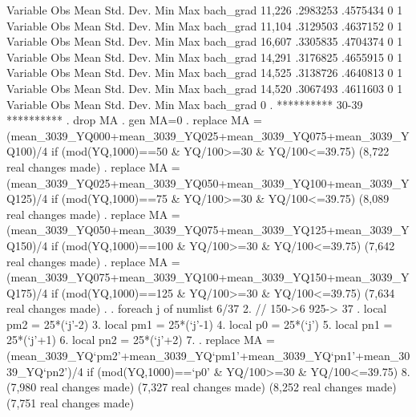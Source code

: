 {\smallskip}
    Variable {\VBAR}        Obs        Mean    Std. Dev.       Min        Max
   bach_grad {\VBAR}     11,226    .2983253    .4575434          0          1
{\smallskip}
    Variable {\VBAR}        Obs        Mean    Std. Dev.       Min        Max
   bach_grad {\VBAR}     11,104    .3129503    .4637152          0          1
{\smallskip}
    Variable {\VBAR}        Obs        Mean    Std. Dev.       Min        Max
   bach_grad {\VBAR}     16,607    .3305835    .4704374          0          1
{\smallskip}
    Variable {\VBAR}        Obs        Mean    Std. Dev.       Min        Max
   bach_grad {\VBAR}     14,291    .3176825    .4655915          0          1
{\smallskip}
    Variable {\VBAR}        Obs        Mean    Std. Dev.       Min        Max
   bach_grad {\VBAR}     14,525    .3138726    .4640813          0          1
{\smallskip}
    Variable {\VBAR}        Obs        Mean    Std. Dev.       Min        Max
   bach_grad {\VBAR}     14,520    .3067493    .4611603          0          1
{\smallskip}
    Variable {\VBAR}        Obs        Mean    Std. Dev.       Min        Max
   bach_grad {\VBAR}          0
{\smallskip}
. **********  30-39 **********
. drop MA
{\smallskip}
. gen MA=0
{\smallskip}
. replace MA = (mean_3039_YQ000+mean_3039_YQ025+mean_3039_YQ075+mean_3039_YQ100)/4 if (mod(YQ,1000)==50 \& YQ/100>=30 \& YQ/100<=39.75)
(8,722 real changes made)
{\smallskip}
. replace MA = (mean_3039_YQ025+mean_3039_YQ050+mean_3039_YQ100+mean_3039_YQ125)/4 if (mod(YQ,1000)==75 \& YQ/100>=30 \& YQ/100<=39.75)
(8,089 real changes made)
{\smallskip}
. replace MA = (mean_3039_YQ050+mean_3039_YQ075+mean_3039_YQ125+mean_3039_YQ150)/4 if (mod(YQ,1000)==100 \& YQ/100>=30 \& YQ/100<=39.75)
(7,642 real changes made)
{\smallskip}
. replace MA = (mean_3039_YQ075+mean_3039_YQ100+mean_3039_YQ150+mean_3039_YQ175)/4 if (mod(YQ,1000)==125 \& YQ/100>=30 \& YQ/100<=39.75)
(7,634 real changes made)
{\smallskip}
. 
. foreach j of numlist 6/37{\lbr}
  2.         // 150->6 925-> 37
.         local pm2 = 25*(`j'-2)
  3.         local pm1 = 25*(`j'-1)
  4.         local p0 = 25*(`j')
  5.         local pn1 = 25*(`j'+1)
  6.         local pn2 = 25*(`j'+2)
  7. 
.         replace MA = (mean_3039_YQ`pm2'+mean_3039_YQ`pm1'+mean_3039_YQ`pn1'+mean_3039_YQ`pn2')/4 if (mod(YQ,1000)==`p0' \& YQ/100>=30 \& YQ/100<=39.75)
  8. {\rbr}
(7,980 real changes made)
(7,327 real changes made)
(8,252 real changes made)
(7,751 real changes made)
